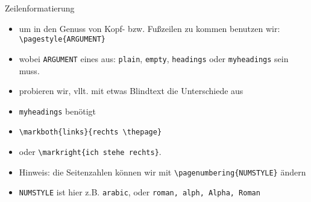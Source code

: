 \begin{frame}[fragile]{Zeilenformatierung}
    \begin{itemize}
        \item um in den Genuss von Kopf- bzw. Fußzeilen zu kommen benutzen wir: \lstinline|\pagestyle{ARGUMENT}|
        \item wobei \texttt{ARGUMENT} eines aus: \texttt{plain}, \texttt{empty}, \texttt{headings} oder \texttt{myheadings} sein muss.
        \item probieren wir, vllt. mit etwas Blindtext die Unterschiede aus
        \item \texttt{myheadings} benötigt
        \item \lstinline|\markboth{links}{rechts \thepage}|
        \item oder \lstinline|\markright{ich stehe rechts}|.
        \item Hinweis: die Seitenzahlen können wir mit \lstinline|\pagenumbering{NUMSTYLE}| ändern
        \item \texttt{NUMSTYLE} ist hier z.B. \texttt{arabic}, oder \texttt{roman, alph, Alpha, Roman}
    \end{itemize}
\end{frame}